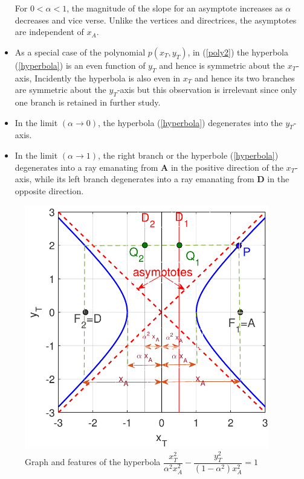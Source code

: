 \begin{itemize}
For $0<\alpha<1$, the magnitude of the slope for an asymptote increases as $\alpha$ decreases and vice verse. Unlike the vertices and directrices, the asymptotes are independent of $x_A$.
\item As a special case of the polynomial $p(x_T,y_T)$, in (\ref{poly2}) the hyperbola (\ref{hyperbola}) is an even function of $y_T$ and hence is symmetric about the $x_T$-axis, Incidently the hyperbola is also even in $x_T$ and hence its two branches are symmetric about the $y_T$-axis but this observation is irrelevant since only one branch is retained in further study.
\item In the limit $(\alpha\to0)$, the hyperbola (\ref{hyperbola}) degenerates into the $y_T$-axis.
\item In the limit $(\alpha\to1)$, the right branch or the hyperbole (\ref{hyperbola}) degenerates into a ray emanating from $\boldsymbol{A}$ in the positive direction of the $x_T$-axis, while its left branch degenerates into a ray emanating from $\boldsymbol{D}$ in the opposite direction.
\end{itemize}    


\begin{figure}[htb]
\centering
\includegraphics[width=0.95\textwidth]{fig/hyperbola.pdf}
\caption{Graph and features of the hyperbola $\dfrac{x_T^2}{\alpha^2 x_A^2} - \dfrac{y_T^2}{(1-\alpha^2)x_A^2}=1$ }
\label{hyperbola graph}
\end{figure}


